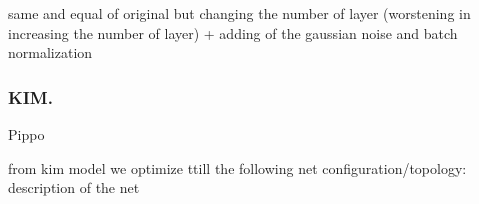 same and equal of original but changing the number of layer  (worstening in increasing the number of layer) + adding of the gaussian noise and batch normalization

\subsubsection{KIM.}

Pippo \cite{kim2014convolutional}



from kim model we optimize ttill the following net configuration/topology: description of the net